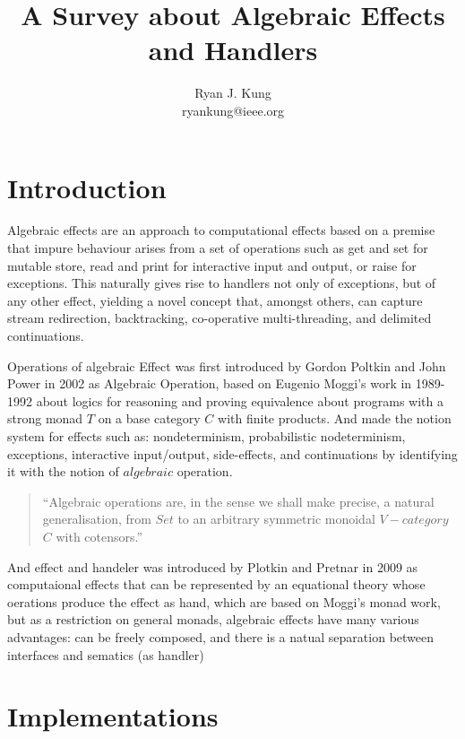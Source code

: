 \documentclass{article}
\author{Ryan J. Kung \\ryankung@ieee.org\\}
\title{A Survey about Algebraic Effects and Handlers}
\begin{document}
\maketitle

\section{Introduction}

Algebraic eﬀects are an approach to computational eﬀects based on a premise that impure behaviour arises from a set of operations such as get and set for mutable store, read and print for interactive input and output, or raise for exceptions. This naturally gives rise to handlers not only of exceptions, but of any other eﬀect, yielding a novel concept that, amongst others, can capture stream redirection, backtracking, co-operative multi-threading, and delimited continuations\cite{intro-algebraic-effects-and-handlers}. 

Operations of algebraic Effect was first introduced by Gordon Poltkin and John Power in 2002 \cite{Plotkin2003} as Algebraic Operation, based on Eugenio Moggi's work \cite{39155, MOGGI91} in 1989-1992 about logics for reasoning and proving equivalence about programs with a strong monad $T$ on a base category $C$ with finite products\cite{Plotkin2003, MOGGI91}. And made the notion system for effects such as: nondeterminism, probabilistic nodeterminism, exceptions, interactive input/output, side-effects, and continuations by identifying it with the notion of $algebraic$ operation.

\begin{quotation}
  ``Algebraic operations are, in the sense we shall make precise, a natural generalisation, from $Set$ to an arbitrary symmetric monoidal $V-category$ $C$ with cotensors.''\cite{Plotkin2003}
\end{quotation}

And effect and handeler was introduced by Plotkin and Pretnar in 2009 \cite{lmcs:705} as computaional effects that can be represented by an equational theory whose oerations produce the effect as hand, which are based on Moggi's monad work, but as a restriction on general monads, algebraic effects have many various advantages: can be freely composed, and there is a natual separation between interfaces and sematics (as handler) \cite{algebraic-effects-for-functional-programming}

\section{Implementations}
\end{document}
